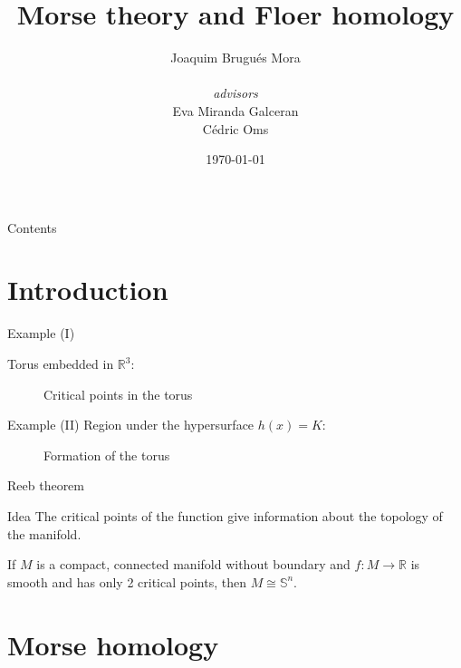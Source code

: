 \documentclass{beamer}
\title{Morse theory and Floer homology}
\author{Joaquim Brugués Mora \\ \ \\ {\it advisors } \\ Eva Miranda Galceran \\ Cédric Oms}
\institute{Facultat de Matemàtiques i Estadística\\ UPC}
\date{\today}
\newcommand{\con}[1]{\mathbb{#1}}
\newcommand{\R}{\con{R}}
\begin{document}
\begin{frame}
	\titlepage
\end{frame}

\begin{frame}{Contents}
	\tableofcontents
\end{frame}

\section{Introduction}
\begin{frame}{Example (I)}
	
	Torus embedded in $\R^3$:

	\begin{figure}[h]
		
		\caption{Critical points in the torus}
		\label{figure:torus1}
	\end{figure}
\end{frame}

\begin{frame}{Example (II)}
	Region under the hypersurface $h(x) = K$:

	\begin{figure}[h]
		\scalebox{.6}{}
		\scalebox{.6}{}
		\caption{Formation of the torus}
		\label{figure:torus2}
	\end{figure}
\end{frame}

\begin{frame}{Reeb theorem}
	\begin{block}{Idea}
		The critical points of the function give information about the topology of the manifold.

	\end{block}

	\begin{figure}[h]
		
		\label{figure:reebtheorem}
	\end{figure}

	\begin{theorem}[Reeb]
		If $M$ is a compact, connected manifold without boundary and $f : M \rightarrow \R$ is smooth and has only 2 critical points, then $M \cong \con{S}^n$.
	\end{theorem}
\end{frame}

\section{Morse homology}
\end{document}
